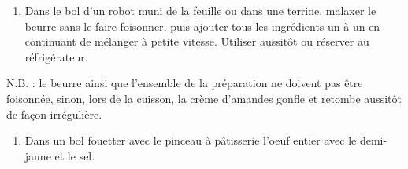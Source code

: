 
\begin{ingredients}
\end{ingredients}


\begin{recipe}
  \begin{enumerate}

  \item Dans le bol d’un robot muni de la feuille ou dans une terrine,
    malaxer le beurre sans le faire foisonner, puis ajouter tous les
    ingrédients un à un en continuant de mélanger à petite vitesse.
    Utiliser aussitôt ou réserver au réfrigérateur.

  \end{enumerate}
\end{recipe}

N.B. : le beurre ainsi que l'ensemble de la préparation ne doivent pas
être foisonnée, sinon, lors de la cuisson, la crème d'amandes gonfle
et retombe aussitôt de façon irrégulière.



\begin{ingredients}
\end{ingredients}


\begin{recipe}
  \begin{enumerate}

  \item Dans un bol fouetter avec le pinceau à pâtisserie l’oeuf
    entier avec le demi-jaune et le sel.

  \end{enumerate}
\end{recipe}



